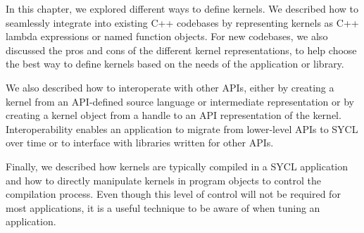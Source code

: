 
In this chapter, we explored different ways to define kernels. We described how to seamlessly integrate into existing C++ codebases by representing kernels as C++ lambda expressions or named function objects. For new codebases, we also discussed the pros and cons of the different kernel representations, to help choose the best way to define kernels based on the needs of the application or library.\par

We also described how to interoperate with other APIs, either by creating a kernel from an API-defined source language or intermediate representation or by creating a kernel object from a handle to an API representation of the kernel. Interoperability enables an application to migrate from lower-level APIs to SYCL over time or to interface with libraries written for other APIs.\par

Finally, we described how kernels are typically compiled in a SYCL application and how to directly manipulate kernels in program objects to control the compilation process. Even though this level of control will not be required for most applications, it is a useful technique to be aware of when tuning an application.\par


\newpage